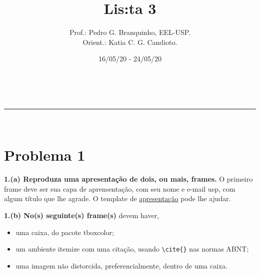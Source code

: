 \documentclass[a4paper,11pt, dvipdfmx]{abntex2}
\makeatletter
\newcommand{\linia}{\rule{\linewidth}{0.5pt}}
\theoremstyle{mytheor}
\renewcommand{\maketitle}{
  \begin{center}
    \vspace{4ex}
    { {\fontsize{40}{40}\selectfont \textfrak{\@title}} }
    \vspace{2ex}
    \\
    \linia\\
    \@author \hfill \@date
    \vspace{6ex}
  \end{center}
}
\makeatother
\begin{document}
  \title{Lis:ta 3}

  \author{\indent  Prof.: Pedro G. Branquinho, EEL-USP. \\
    Orient.: Katia C. G. Candioto.}

  \date{16/05/20 - 24/05/20}

  \maketitle

  \section*{Problema 1}
\textbf{1.(a) Reproduza uma apresentação de dois, ou mais, frames.} O
primeiro frame deve ser sua capa de aprensentação, com seu nome e e-mail
usp, com algum título que lhe agrade. O template de
\href{https://github.com/26-55-87-BuddhiLW/MC-LaTeX/tree/master/Exemplos/ArquivosCurso/ModApresent}{apresentação}
pode lhe ajudar.

\vspace{10mm}

\begin{flushleft}
\textbf{1.(b) No(s) seguinte(s) frame(s)} devem haver,

\begin{itemize}
\item uma caixa, do pacote tboxcolor;
\item um ambiente itemize com uma citação, usando \verb+\cite{}+ nas normas ABNT;
\item uma imagem não distorcida, preferencialmente, dentro de uma caixa.
\end{itemize}

\end{flushleft}
\end{document}
